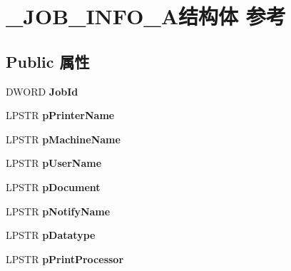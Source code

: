 \hypertarget{struct___j_o_b___i_n_f_o__2_a}{}\section{\+\_\+\+J\+O\+B\+\_\+\+I\+N\+F\+O\+\_\+A结构体 参考}
\label{struct___j_o_b___i_n_f_o__2_a}
\subsection*{Public 属性}
\begin{DoxyCompactItemize}
\item 
\mbox{\label{struct___j_o_b___i_n_f_o__2_a_a23a1027bbf4109b7f37f856c50e9c290}} 
D\+W\+O\+RD {\bfseries Job\+Id}
\item 
\mbox{\label{struct___j_o_b___i_n_f_o__2_a_a31edcd9f8a4f9710b5d1fde44776e25d}} 
L\+P\+S\+TR {\bfseries p\+Printer\+Name}
\item 
\mbox{\label{struct___j_o_b___i_n_f_o__2_a_af2c14e7997b01bb1aa29501d253caed2}} 
L\+P\+S\+TR {\bfseries p\+Machine\+Name}
\item 
\mbox{\label{struct___j_o_b___i_n_f_o__2_a_a94e64996659b141e8322a639d1e3ceb8}} 
L\+P\+S\+TR {\bfseries p\+User\+Name}
\item 
\mbox{\label{struct___j_o_b___i_n_f_o__2_a_a2ab886e6dfd4ed03593f8ab98acd5a00}} 
L\+P\+S\+TR {\bfseries p\+Document}
\item 
\mbox{\label{struct___j_o_b___i_n_f_o__2_a_a33e9b9a2d0e2a346261077d5f1c5e403}} 
L\+P\+S\+TR {\bfseries p\+Notify\+Name}
\item 
\mbox{\label{struct___j_o_b___i_n_f_o__2_a_aa27272ba6f875a8b8fdee7d20d4cc98f}} 
L\+P\+S\+TR {\bfseries p\+Datatype}
\item 
\mbox{\label{struct___j_o_b___i_n_f_o__2_a_a46502c459cca4392f5646a4590f78a62}} 
L\+P\+S\+TR {\bfseries p\+Print\+Processor}
\item 

\end{DoxyCompactItemize}
